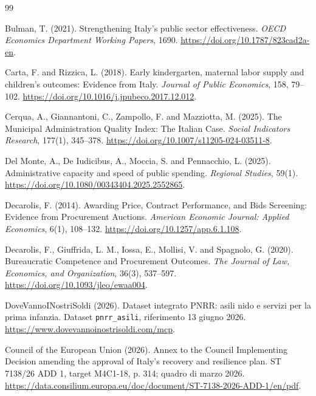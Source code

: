 \documentclass[10pt,a4paper]{article}
\begin{document}
\clearpage
\begin{thebibliography}{99}

Bulman, T. (2021).
\newblock Strengthening Italy's public sector effectiveness.
\newblock \emph{OECD Economics Department Working Papers}, 1690.
\newblock \url{https://doi.org/10.1787/823cad2a-en}.

Carta, F. and Rizzica, L. (2018).
\newblock Early kindergarten, maternal labor supply and children's outcomes: Evidence from Italy.
\newblock \emph{Journal of Public Economics}, 158, 79--102.
\newblock \url{https://doi.org/10.1016/j.jpubeco.2017.12.012}.

Cerqua, A., Giannantoni, C., Zampollo, F. and Mazziotta, M. (2025).
\newblock The Municipal Administration Quality Index: The Italian Case.
\newblock \emph{Social Indicators Research}, 177(1), 345--378.
\newblock \url{https://doi.org/10.1007/s11205-024-03511-8}.

Del Monte, A., De Iudicibus, A., Moccia, S. and Pennacchio, L. (2025).
\newblock Administrative capacity and speed of public spending.
\newblock \emph{Regional Studies}, 59(1).
\newblock \url{https://doi.org/10.1080/00343404.2025.2552865}.

Decarolis, F. (2014).
\newblock Awarding Price, Contract Performance, and Bids Screening: Evidence from Procurement Auctions.
\newblock \emph{American Economic Journal: Applied Economics}, 6(1), 108--132.
\newblock \url{https://doi.org/10.1257/app.6.1.108}.

Decarolis, F., Giuffrida, L. M., Iossa, E., Mollisi, V. and Spagnolo, G. (2020).
\newblock Bureaucratic Competence and Procurement Outcomes.
\newblock \emph{The Journal of Law, Economics, and Organization}, 36(3), 537--597.
\newblock \url{https://doi.org/10.1093/jleo/ewaa004}.

DoveVannoINostriSoldi (2026).
\newblock Dataset integrato PNRR: asili nido e servizi per la prima infanzia.
\newblock Dataset \texttt{pnrr\_asili}, riferimento 13 giugno 2026.
\newblock \url{https://www.dovevannoinostrisoldi.com/mcp}.

Council of the European Union (2026).
\newblock Annex to the Council Implementing Decision amending the approval of Italy's recovery and resilience plan.
\newblock ST 7138/26 ADD 1, target M4C1-18, p. 314; quadro di marzo 2026.
\newblock \url{https://data.consilium.europa.eu/doc/document/ST-7138-2026-ADD-1/en/pdf}.


\end{thebibliography}
\end{document}

